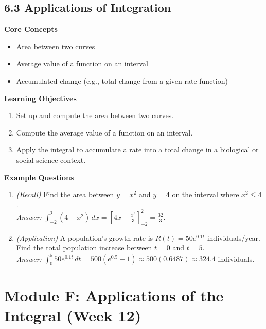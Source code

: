 \documentclass[11pt]{article}
\begin{document}
\subsection{6.3 Applications of Integration}
\textbf{Core Concepts}
\begin{itemize}
\item Area between two curves
\item Average value of a function on an interval
\item Accumulated change (e.g., total change from a given rate function)
\end{itemize}
\textbf{Learning Objectives}
\begin{enumerate}
\item Set up and compute the area between two curves.
\item Compute the average value of a function on an interval.
\item Apply the integral to accumulate a rate into a total change in a biological or social-science context.
\end{enumerate}
\textbf{Example Questions}
\begin{enumerate}
\item \emph{(Recall)} Find the area between $y=x^2$ and $y=4$ on the interval where $x^2 \le 4$. \\
\textit{Answer:} $\int_{-2}^{2}(4-x^2)\,dx = \left[4x-\tfrac{x^3}{3}\right]_{-2}^{2} = \tfrac{32}{3}$.
\item \emph{(Application)} A population's growth rate is $R(t) = 50e^{0.1t}$ individuals/year. Find the total population increase between $t=0$ and $t=5$. \\
\textit{Answer:} $\int_0^5 50e^{0.1t}\,dt = 500\left(e^{0.5}-1\right) \approx 500(0.6487)\approx 324.4$ individuals.
\end{enumerate}

\section{Module F: Applications of the Integral (Week 12)}
\end{document}
